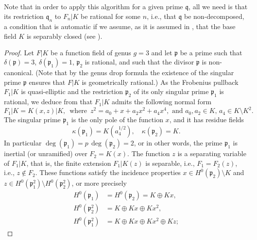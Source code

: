 \documentclass[12pt,reqno]{amsart}
\newcommand{\todoo}[2][]{\todo[size=tiny, #1]{#2}} %
\newcommand{\toda}[2][]{\todo[color=blue!30, #1]{#2}} %
\theoremstyle{definition}
\newcommand{\pp}{\mathfrak{p}}
\newcommand{\fq}{\mathfrak{q}}
\newcommand{\de}{\delta}
\newcommand{\ka}{\kappa}
\begin{document}
Note that in order to apply this algorithm for a given prime $\fq$, all we need is that its restriction $\fq_n$ to $F_n|K$ be rational for some $n$, i.e., that $\fq$ be non-decomposed, a condition that is automatic if we assume, as it is assumed in \cite{BedSt87}, that the base field $K$ is separably closed (see \cite[Corollary~2.17]{HiSt22}).

\begin{proof}
Let $F|K$ be a function field of genus $g = 3$ and let $\pp$ be a prime such that $\de(\pp) = 3$, $\de(\pp_1) = 1$, $\pp_2$ is rational, and such that the divisor $\pp$ is non-canonical. 
(Note that by the genus drop formula \cite[Formula~2.3]{HiSt22} the existence of the singular prime $\pp$ ensures that $F|K$ is geometrically rational.)
As the Frobenius pullback $F_1|K$ is quasi-elliptic and the restriction $\pp_2$ of its only singular prime $\pp_1$ is rational, 
we deduce from \cite[Theorem~2.1~(i)]{HiSt23} that $F_1|K$ admits the following normal form
\[ F_1|K = K(x,z)|K, \, \text{ where } \, z^2 = a_0 + x + a_2 x^2 + a_4 x^4, \text{ and $a_0,a_2 \in K$, $a_4 \in K \setminus K^2$}. \]
The singular prime $\pp_1$ is the only pole of the function $x$, and it has residue fields
\[ \ka(\pp_1)=K(a_4^{1/2}), \quad \ka(\pp_2)=K . \]
In particular 
$\deg(\pp_1) = p \, \deg(\pp_2) = 2$,
or in other words,
the prime $\pp_1$ is inertial (or unramified) over $F_2=K(x)$.
The function $z$ is a separating variable 
of $F_1|K$, that is, the finite extension $F_1|K(z)$ is separable, i.e., $F_1=F_2(z)$, i.e., $z\notin F_2$.
These functions satisfy the incidence properties $x\in H^0(\pp_2) \setminus K$ and $z \in H^0(\pp_1^2) \setminus H^0(\pp_2^2)$, or more precisely
\begin{align*}
    H^0(\pp_1) &= H^0(\pp_2) = K \oplus Kx, \\
    H^0(\pp_2^2) &=  K \oplus Kx \oplus Kx^2, \\
    H^0(\pp_1^2) &= K \oplus Kx \oplus Kx^2 \oplus Kz;

\end{align*}
\end{proof}
\end{document}
